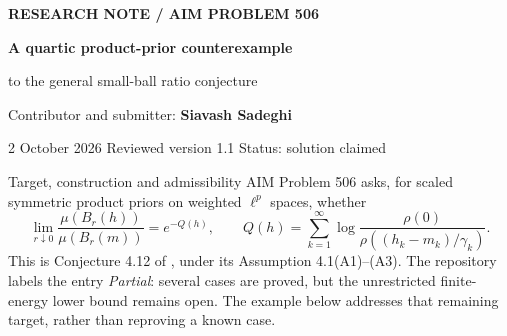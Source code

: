 \documentclass[11pt]{article}
\makeatletter
\renewcommand{\section}{\@startsection{section}{1}{0pt}
  {-3.5ex plus -1ex minus -.2ex}{2.3ex plus .2ex}
  {\normalfont\large\bfseries\color{MidnightBlue}}}
\theoremstyle{remark}
\makeatother
\begin{document}
\thispagestyle{empty}
{\small\color{MidnightBlue}\textbf{RESEARCH NOTE \quad / \quad AIM PROBLEM 506}}
\vspace{8pt}

{\LARGE\bfseries A quartic product-prior counterexample\par}
\vspace{4pt}
{\Large to the general small-ball ratio conjecture\par}
\vspace{9pt}
{\normalsize Contributor and submitter: \textbf{Siavash Sadeghi}}\par
{\small 2 October 2026 \quad Reviewed version 1.1 \quad Status: solution claimed}
\vspace{9pt}

\begin{abstract}
\noindent
We give a proposed counterexample to the unresolved general statement in AIM Problem 506, equivalently Conjecture 4.12 of Ayanbayev, Klebanov, Lie and Sullivan. On $\ell^2$ we construct a countable product of scaled copies of the density $\rho(z)\propto e^{-z^4}$ and an explicit center $h$ with formal energy $Q(h)=1$, but
\[
\liminf_{r\downarrow0}\frac{\mu(B_r(h))}{\mu(B_r(0))}=0\ne e^{-1}.
\]
The density is positive, real analytic and log-concave, with finite Fisher information. A one-dimensional Gaussian-convolution inequality and a Laplace-transform averaging identity give a self-contained analytic disproof. We also give explicit bounds on a vanishing sequence of ball ratios, arbitrarily small-energy counterexamples, and a second example with polynomial coordinate scales. Exact-arithmetic certificates and separate numerical checks are supplementary, not prerequisites for the main theorem. No assertion that the full small-ball ratio limit exists is needed or made.
\end{abstract}

\section{Target, construction and admissibility}
AIM Problem 506 \cite{aim506} asks, for scaled symmetric product priors on weighted $\ell^p$ spaces, whether
\begin{equation}\label{eq:conjecture}
\lim_{r\downarrow0}\frac{\mu(B_r(h))}{\mu(B_r(m))}=e^{-Q(h)},
\qquad
Q(h)=\sum_{k=1}^{\infty}\log\frac{\rho(0)}{\rho((h_k-m_k)/\gamma_k)}.
\end{equation}
This is Conjecture 4.12 of \cite{AKLS}, under its Assumption 4.1(A1)--(A3). The repository labels the entry \emph{Partial}: several cases are proved, but the unrestricted finite-energy lower bound remains open. The example below addresses that remaining target, rather than reproving a known case.
\end{document}

